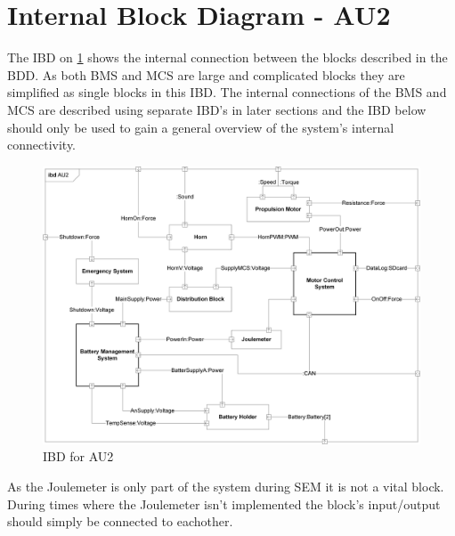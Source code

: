 \section{Internal Block Diagram - AU2}
\label{sec:IBDAU2}
The IBD on \ref{fig:IBD} shows the internal connection between the blocks described in the BDD. As both BMS and MCS are large and complicated blocks they are simplified as single blocks in this IBD. The internal connections of the BMS and MCS are described using separate IBD's in later sections and the IBD below should only be used to gain a general overview of the system's internal connectivity. 

\begin{figure}[H]
	\centering
	\includegraphics[width=1\linewidth]{Architecture/Diagrams/IBD_AU2}
	\caption{IBD for AU2}
	\label{fig:IBD}
\end{figure}

As the Joulemeter is only part of the system during SEM it is not a vital block. During times where the Joulemeter isn't implemented the block's input/output should simply be connected to eachother.

